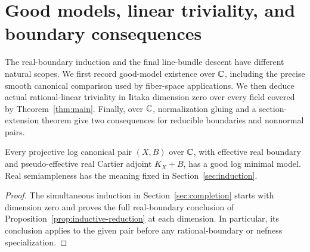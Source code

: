 \section{Good models, linear triviality, and boundary consequences}
\label{sec:consequences}

The real-boundary induction and the final line-bundle descent have
different natural scopes. We first record good-model existence over
\(\mathbb{C}\), including the precise smooth canonical comparison used by
fiber-space applications. We then deduce actual rational-linear
triviality in Iitaka dimension zero over every field covered by
Theorem~\ref{thm:main}.
Finally, over \(\mathbb{C}\), normalization gluing and a section-extension
theorem give two consequences for reducible boundaries and nonnormal pairs.

\begin{theorem}
\label{thm:good-models-complex}
Every projective log canonical pair \((X,B)\) over \(\mathbb{C}\), with
effective real boundary and pseudo-effective real Cartier adjoint
\(K_X+B\), has a good log minimal model. Real semiampleness has the
meaning fixed in Section~\ref{sec:induction}.
\end{theorem}
\begin{proof}
The simultaneous induction in Section~\ref{sec:completion} starts with
dimension zero and proves the full real-boundary conclusion of
Proposition~\ref{prop:inductive-reduction} at each dimension. In
particular, its conclusion applies to the given pair before any
rational-boundary or nefness specialization.
\end{proof}

